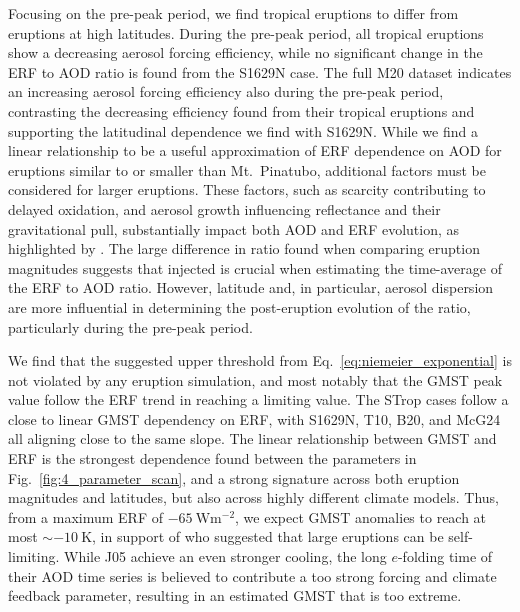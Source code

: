\documentclass[draft]{agujournal2019}
\begin{document}
  Focusing on the pre-peak period, we find tropical eruptions to differ from eruptions
  at high latitudes. During the pre-peak period, all tropical eruptions show a
  decreasing aerosol forcing efficiency, while no significant change in the ERF to AOD
  ratio is found from the S1629N case. The full M20 dataset indicates an increasing
  aerosol forcing efficiency also during the pre-peak period, contrasting the decreasing
  efficiency found from their tropical eruptions and supporting the latitudinal
  dependence we find with S1629N. While we find a linear relationship to be a useful
  approximation of ERF dependence on AOD for eruptions similar to or smaller than Mt.\
  Pinatubo, additional factors must be considered for larger eruptions. These factors,
  such as \ce{OH} scarcity contributing to delayed \ce{SO2} oxidation, and aerosol
  growth influencing reflectance and their gravitational pull, substantially impact both
  AOD and ERF evolution, as highlighted by \citeA{timmreck2010}. The large difference in
  ratio found when comparing eruption magnitudes suggests that injected \ce{SO2} is
  crucial when estimating the time-average of the ERF to AOD ratio. However, latitude
  and, in particular, aerosol dispersion are more influential in determining the
  post-eruption evolution of the ratio, particularly during the pre-peak period.

  We find that the suggested upper threshold from Eq.~\ref{eq:niemeier_exponential} is
  not violated by any eruption simulation, and most notably that the GMST peak value
  follow the ERF trend in reaching a limiting value. The STrop cases follow a close to
  linear GMST dependency on ERF, with S1629N, T10, B20, and McG24 all aligning close to
  the same slope. The linear relationship between GMST and ERF is the strongest
  dependence found between the parameters in Fig.~\ref{fig:4_parameter_scan}, and a
  strong signature across both eruption magnitudes and latitudes, but also across highly
  different climate models. Thus, from a maximum ERF of \(\SI{-65}{\watt\metre^{-2}}\),
  we expect GMST anomalies to reach at most \(\sim\SI{-10}{\kelvin}\), in support of
  \citeA{english2013} who suggested that large eruptions can be self-limiting. While J05
  achieve an even stronger cooling, the long \(e\)-folding time of their AOD time series
  is believed to contribute a too strong forcing and climate feedback parameter,
  resulting in an estimated GMST that is too extreme.
\end{document}
